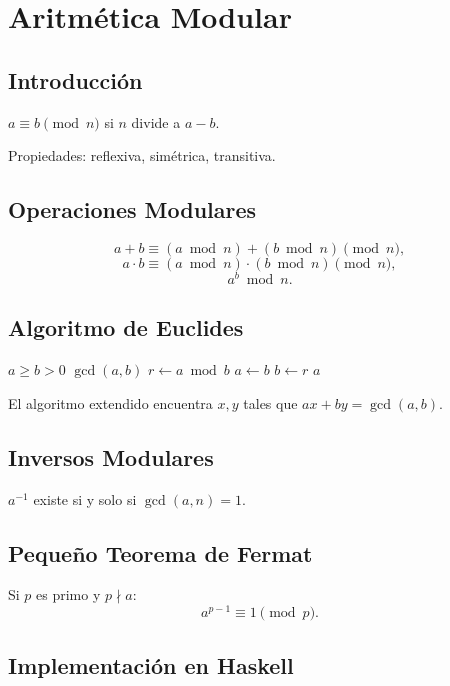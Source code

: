 \chapter{Aritmética Modular}

\section{Introducción}
$a \equiv b \pmod{n}$ si $n$ divide a $a - b$.

Propiedades: reflexiva, simétrica, transitiva.

\section{Operaciones Modulares}
\[
a + b \equiv (a \bmod n) + (b \bmod n) \pmod{n},
\]
\[
a \cdot b \equiv (a \bmod n) \cdot (b \bmod n) \pmod{n},
\]
\[
a^b \bmod n.
\]

\section{Algoritmo de Euclides}

\begin{algorithm}[htbp]
\caption{Algoritmo de Euclides}
\begin{algorithmic}[1]
\Require $a \geq b > 0$
\Ensure $\gcd(a,b)$
  \State $r \gets a \bmod b$
  \State $a \gets b$
  \State $b \gets r$
\EndWhile
\State \Return $a$
\end{algorithmic}
\end{algorithm}

El algoritmo extendido encuentra $x, y$ tales que $ax + by = \gcd(a,b)$.

\section{Inversos Modulares}
$a^{-1}$ existe si y solo si $\gcd(a,n) = 1$.

\section{Pequeño Teorema de Fermat}
Si $p$ es primo y $p \nmid a$:
\[
a^{p-1} \equiv 1 \pmod{p}.
\]

\section{Implementación en Haskell}

